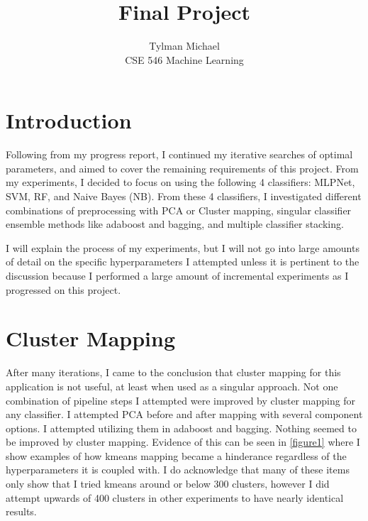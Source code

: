 \documentclass[12pt]{article}
\title{Final Project}
\author{Tylman Michael\\CSE 546 Machine Learning}
\begin{document}
\maketitle{}
\section{Introduction}
Following from my progress report, I continued my iterative searches of optimal parameters, and aimed to cover the remaining 
requirements of this project. From my experiments, I decided to focus on using the following 4 classifiers: MLPNet, SVM, RF, 
and Naive Bayes (NB). From these 4 classifiers, I investigated different combinations of preprocessing with PCA or Cluster mapping, 
singular classifier ensemble methods like adaboost and bagging, and multiple classifier stacking.

I will explain the process of my experiments, but I will not go into large amounts of detail on the specific hyperparameters I attempted 
unless it is pertinent to the discussion because I performed a large amount of incremental experiments as I progressed on this project.

\section{Cluster Mapping}
After many iterations, I came to the conclusion that cluster mapping for this application is not useful, at least when used as a singular 
approach. Not one combination of pipeline steps I attempted were improved by cluster mapping for any classifier. I attempted PCA before and after mapping 
with several component options. I attempted utilizing them in adaboost and bagging. Nothing seemed to be improved by cluster mapping. Evidence of 
this can be seen in \ref{figure1} where I show examples of how kmeans mapping became a hinderance regardless of the hyperparameters it is coupled 
with. I do acknowledge that many of these items only show that I tried kmeans around or below 300 clusters, however I did attempt upwards of 
400 clusters in other experiments to have nearly identical results.
\end{document}
